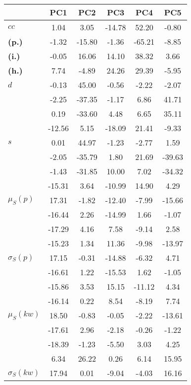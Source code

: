 \begin{table}[h!]
\begin{center}
\begin{tabular}{| l || c | c | c | c | c |}\hline
 & {\bf PC1} & {\bf PC2} & {\bf PC3} & {\bf PC4} & {\bf PC5} \\\hline\hline
{\bf $cc$} & 1.04 & 3.05 & -14.78 & 52.20 & -0.80 \\
{\bf (p.)} & -1.32 & -15.80 & -1.36 & -65.21 & -8.85 \\
{\bf (i.)} & -0.05 & 16.06 & 14.10 & 38.32 & 3.66 \\
{\bf (h.)} & 7.74 & -4.89 & 24.26 & 29.39 & -5.95 \\\hline
{\bf $d$} & -0.13 & 45.00 & -0.56 & -2.22 & -2.07 \\
{\bf } & -2.25 & -37.35 & -1.17 & 6.86 & 41.71 \\
{\bf } & 0.19 & -33.60 & 4.48 & 6.65 & 35.11 \\
{\bf } & -12.56 & 5.15 & -18.09 & 21.41 & -9.33 \\\hline
{\bf $s$} & 0.01 & 44.97 & -1.23 & -2.77 & 1.59 \\
{\bf } & -2.05 & -35.79 & 1.80 & 21.69 & -39.63 \\
 & -1.43  & -31.85  & 10.00  & 7.02  & -34.32 \\
 & -15.31  & 3.64  & -10.99  & 14.90  & 4.29 \\\hline
$\mu_S(p)$ & 17.31  & -1.82  & -12.40  & -7.99  & -15.66 \\
 & -16.44  & 2.26  & -14.99  & 1.66  & -1.07 \\
 & -17.29  & 4.16  & 7.58  & -9.14  & 2.58 \\
 & -15.23  & 1.34  & 11.36  & -9.98  & -13.97 \\\hline
$\sigma_S(p)$ & 17.15  & -0.31  & -14.88  & -6.32  & 4.71 \\
 & -16.61  & 1.22  & -15.53  & 1.62  & -1.05 \\
 & -15.86  & 3.53  & 15.15  & -11.12  & 4.34 \\
 & -16.14  & 0.22  & 8.54  & -8.19  & 7.74 \\\hline
$\mu_S(kw)$ & 18.50  & -0.83  & -0.05  & -2.22  & -13.61 \\
 & -17.61  & 2.96  & -2.18  & -0.26  & -1.22 \\
 & -18.39  & -1.23  & -5.50  & 3.03  & 4.25 \\
 & 6.34  & 26.22  & 0.26  & 6.14  & 15.95 \\\hline
$\sigma_S(kw)$ & 17.94  & 0.01  & -9.04  & -4.03  & 16.16 \\

\end{tabular}
\end{center}
\end{table}
